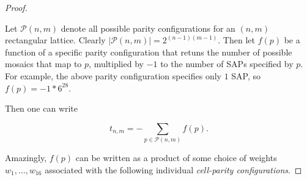 \documentclass[12pt]{article}
\theoremstyle{plain}
\theoremstyle{definition}
\theoremstyle{remark}
\theoremstyle{definition}
\begin{document}
\begin{proof}
\begin{center}
\end{center}

Let $\mathcal{P} (n,m)$ denote all possible parity configurations for an $(n,m)$ rectangular lattice. Clearly $|\mathcal{P} (n,m)| = 2^{(n-1)(m-1)}$. Then let $f(p)$ be a function of a specific parity configuration that retuns the number of possible mosaics that map to $p$, multiplied by $-1$ to the number of SAPs specified by $p$. For example, the above parity configuration specifies only $1$ SAP, so $f(p) = -1 * 6^{28}$. 

Then one can write

$$t_{n,m} = -\sum_{p \in \mathcal{P}(n,m)}f(p).$$

Amazingly, $f(p)$ can be written as a product of some choice of weights $w_{1} , \dots, w_{16}$ associated with the following individual \textit{cell-parity configurations}.


\end{proof}
\end{document}
